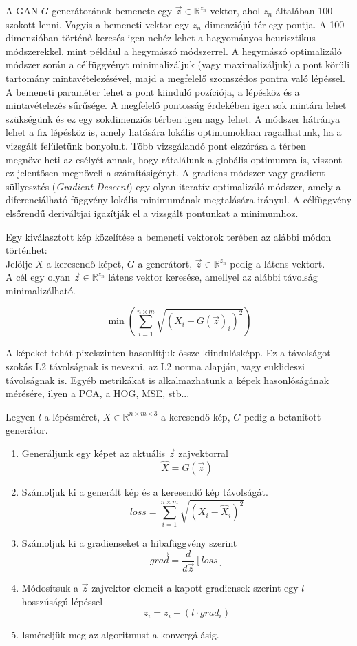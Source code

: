 A GAN $G$ generátorának bemenete egy $\vec{z} \in \mathbb{R}^{z_n}$ vektor, ahol $z_n$ általában 100 szokott lenni. Vagyis a bemeneti vektor egy $z_n$ dimenziójú tér egy pontja. A 100 dimenzióban történő keresés igen nehéz lehet a hagyományos heurisztikus módszerekkel, mint például a hegymászó módszerrel. A hegymászó optimalizáló módszer során a célfüggvényt minimalizáljuk (vagy maximalizáljuk) a pont körüli tartomány mintavételezésével, majd a megfelelő szomszédos pontra való lépéssel. A bemeneti paraméter lehet a pont kiinduló pozíciója, a lépésköz és a mintavételezés sűrűsége. A megfelelő pontosság érdekében igen sok mintára lehet szükségünk és ez egy sokdimenziós térben igen nagy lehet. A módszer hátránya lehet a fix lépésköz is, amely hatására lokális optimumokban ragadhatunk, ha a vizsgált felületünk bonyolult. Több vizsgálandó pont elszórása a térben megnövelheti az esélyét annak, hogy rátalálunk a globális optimumra is, viszont ez jelentősen megnöveli a számításigényt.
A gradiens módszer vagy gradient süllyesztés (\textit{Gradient Descent}) egy olyan iteratív optimalizáló módszer, amely a diferenciálható függvény lokális minimumának megtalására irányul. A célfüggvény elsőrendű deriváltjai igazítják el a vizsgált pontunkat a minimumhoz.

Egy kiválasztott kép közelítése a bemeneti vektorok terében az alábbi módon történhet:\\ 
Jelölje $X$ a keresendő képet, $G$ a generátort, $\vec{z} \in \mathbb{R}^{z_n}$ pedig a látens vektort.\\
A cél egy olyan $\vec{z} \in \mathbb{R}^{z_n}$ látens vektor keresése, amellyel az alábbi távolság minimalizálható.

$$ \min\left(\sum_{i=1}^{n\times m}\sqrt{(X_i-G(\vec{z})_i)^2}\right)$$

A képeket tehát pixelszinten hasonlítjuk össze kiindulásképp. Ez a távolságot szokás L2 távolságnak is nevezni, az L2 norma alapján, vagy euklideszi távolságnak is.
Egyéb metrikákat is alkalmazhatunk a képek hasonlóságának mérésére, ilyen a PCA, a HOG, MSE, stb...

Legyen $l$ a lépésméret, $X \in \mathbb{R}^{n\times m \times 3}$ a keresendő kép, $G$ pedig a betanított generátor.
\begin{enumerate}
	\item Generáljunk egy képet az aktuális $\vec{z}$ zajvektorral
$$\hat X = G(\vec{z})$$
	\item Számoljuk ki a generált kép és a keresendő kép távolságát.
$$ loss = \sum_{i=1}^{n\times m}\sqrt{(X_i-\hat X_i)^2} $$
	\item Számoljuk ki a gradienseket a hibafüggvény szerint
$$ \vec{grad} = \frac{d}{d\vec{z}} \left[loss\right]$$
	\item Módosítsuk a $\vec{z}$ zajvektor elemeit a kapott gradiensek szerint egy $l$ hosszúságú lépéssel
$$ z_i = z_i - (l \cdot grad_i)$$
	\item Ismételjük meg az algoritmust a konvergálásig.
\end{enumerate}

